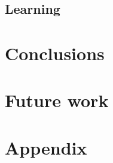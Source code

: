 \documentclass[pdftex,12pt,a4paper]{report}
\begin{document}
\subsection{Learning}


\section{Conclusions}



\section{Future work}


\section{Appendix}


 
\end{document}
